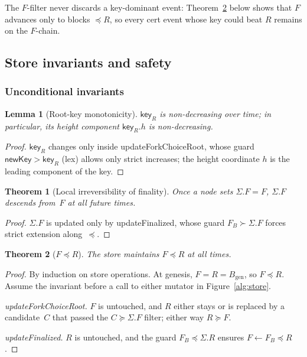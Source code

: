 \ifx\litemode\undefined\documentclass{article}\fi
\newcommand{\genesis}{\ensuremath{B_{\mathrm{gen}}}}
\newcommand{\key}{\mathsf{key}}
\newcommand{\newKey}{\mathsf{newKey}}
\newcommand{\updateForkChoiceRoot}{\textsf{updateForkChoiceRoot}\xspace}
\newcommand{\updateFinalized}{\textsf{updateFinalized}\xspace}
\theoremstyle{plain}
\newtheorem{theorem}{Theorem}
\newtheorem{lemma}{Lemma}
\theoremstyle{definition}
\theoremstyle{remark}
\begin{document}
The $F$-filter never discards a key-dominant event: Theorem~\ref{thm:fleqr} below shows that $F$ advances only to blocks $\preceq R$, so every cert event whose key could beat $R$ remains on the $F$-chain.

\subsection{Store invariants and safety}

\subsubsection*{Unconditional invariants}

\begin{lemma}[Root-key monotonicity]\label{lem:Rs-key-monotone}
$\key_R$ is non-decreasing over time; in particular, its height component $\key_R.h$ is non-decreasing.
\end{lemma}

\begin{proof}
$\key_R$ changes only inside \updateForkChoiceRoot, whose guard $\newKey > \key_R$ (lex) allows only strict increases; the height coordinate $h$ is the leading component of the key.
\end{proof}

\begin{theorem}[Local irreversibility of finality]\label{thm:finperm}
Once a node sets $\Sigma.F = F$, $\Sigma.F$ descends from~$F$ at all future times.
\end{theorem}

\begin{proof}
$\Sigma.F$ is updated only by \updateFinalized, whose guard $F_B \succ \Sigma.F$ forces strict extension along~$\preceq$.
\end{proof}

\begin{theorem}[$F \preceq R$]\label{thm:fleqr}
The store maintains $F \preceq R$ at all times.
\end{theorem}

\begin{proof}
By induction on store operations.
At genesis, $F = R = \genesis$, so $F \preceq R$.
Assume the invariant before a call to either mutator in Figure~\ref{alg:store}.

\emph{\updateForkChoiceRoot.}
$F$ is untouched, and $R$ either stays or is replaced by a candidate~$C$ that passed the $C \succeq \Sigma.F$ filter; either way $R \succeq F$.

\emph{\updateFinalized.}
$R$ is untouched, and the guard $F_B \preceq \Sigma.R$ ensures $F \gets F_B \preceq R$.
\end{proof}
\end{document}
